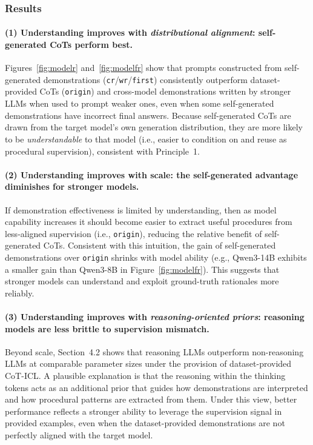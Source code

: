 \documentclass{llmxive}
\begin{document}
\subsubsection{Results} 


\paragraph{(1) Understanding improves with \emph{distributional alignment}: self-generated CoTs perform best.}
Figures~\ref{fig:modelr} and~\ref{fig:modelfr} show that prompts constructed from self-generated demonstrations (\texttt{cr}/\texttt{wr}/\texttt{first}) consistently outperform dataset-provided CoTs (\texttt{origin}) and cross-model demonstrations written by stronger LLMs when used to prompt weaker ones, even when some self-generated demonstrations have incorrect final answers.
Because self-generated CoTs are drawn from the target model's own generation distribution, they are more likely to be \emph{understandable} to that model (i.e., easier to condition on and reuse as procedural supervision), consistent with Principle~1.

\paragraph{(2) Understanding improves with scale: the self-generated advantage diminishes for stronger models.}
If demonstration effectiveness is limited by understanding, then as model capability increases it should become easier to extract useful procedures from less-aligned supervision (i.e., \texttt{origin}), reducing the relative benefit of self-generated CoTs.
Consistent with this intuition, the gain of self-generated demonstrations over \texttt{origin} shrinks with model ability (e.g., Qwen3-14B exhibits a smaller gain than Qwen3-8B in Figure~\ref{fig:modelfr}).
This suggests that stronger models can understand and exploit ground-truth rationales more reliably.

\paragraph{(3) Understanding improves with \emph{reasoning-oriented priors}: reasoning models are less brittle to supervision mismatch.}
Beyond scale, Section~4.2 shows that reasoning LLMs outperform non-reasoning LLMs at comparable parameter sizes under the provision of dataset-provided CoT-ICL.
A plausible explanation is that the reasoning within the thinking tokens acts as an additional prior that guides how demonstrations are interpreted and how procedural patterns are extracted from them. Under this view, better performance reflects a stronger ability to leverage the supervision signal in provided examples, even when the dataset-provided demonstrations are not perfectly aligned with the target model.
\end{document}
